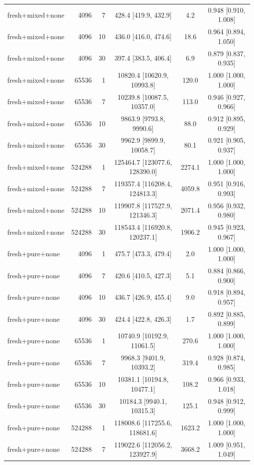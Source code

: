 \begin{longtable}{lrrccc}
fresh+mixed+none & 4096 & 7 & 428.4 [419.9, 432.9] & 4.2 & 0.948 [0.910, 1.008] \\
fresh+mixed+none & 4096 & 10 & 436.0 [416.0, 474.6] & 18.6 & 0.964 [0.894, 1.050] \\
fresh+mixed+none & 4096 & 30 & 397.4 [383.5, 406.4] & 6.9 & 0.879 [0.837, 0.935] \\
fresh+mixed+none & 65536 & 1 & 10820.4 [10620.9, 10993.8] & 120.0 & 1.000 [1.000, 1.000] \\
fresh+mixed+none & 65536 & 7 & 10239.8 [10087.5, 10357.0] & 113.0 & 0.946 [0.927, 0.966] \\
fresh+mixed+none & 65536 & 10 & 9863.9 [9793.8, 9990.6] & 88.0 & 0.912 [0.895, 0.929] \\
fresh+mixed+none & 65536 & 30 & 9962.9 [9899.9, 10058.7] & 80.1 & 0.921 [0.905, 0.937] \\
fresh+mixed+none & 524288 & 1 & 125464.7 [123077.6, 128390.0] & 2274.1 & 1.000 [1.000, 1.000] \\
fresh+mixed+none & 524288 & 7 & 119357.4 [116208.4, 124813.3] & 4059.8 & 0.951 [0.916, 0.993] \\
fresh+mixed+none & 524288 & 10 & 119907.8 [117527.9, 121346.3] & 2071.4 & 0.956 [0.932, 0.980] \\
fresh+mixed+none & 524288 & 30 & 118543.4 [116920.8, 120237.1] & 1906.2 & 0.945 [0.923, 0.967] \\
fresh+pure+none & 4096 & 1 & 475.7 [473.3, 479.4] & 2.0 & 1.000 [1.000, 1.000] \\
fresh+pure+none & 4096 & 7 & 420.6 [410.5, 427.3] & 5.1 & 0.884 [0.866, 0.900] \\
fresh+pure+none & 4096 & 10 & 436.7 [426.9, 455.4] & 9.0 & 0.918 [0.894, 0.957] \\
fresh+pure+none & 4096 & 30 & 424.4 [422.8, 426.3] & 1.7 & 0.892 [0.885, 0.899] \\
fresh+pure+none & 65536 & 1 & 10740.9 [10192.9, 11061.5] & 270.6 & 1.000 [1.000, 1.000] \\
fresh+pure+none & 65536 & 7 & 9968.3 [9401.9, 10393.2] & 319.4 & 0.928 [0.874, 0.985] \\
fresh+pure+none & 65536 & 10 & 10381.1 [10194.8, 10477.1] & 108.2 & 0.966 [0.933, 1.018] \\
fresh+pure+none & 65536 & 30 & 10184.3 [9940.1, 10315.3] & 125.1 & 0.948 [0.912, 0.999] \\
fresh+pure+none & 524288 & 1 & 118008.6 [117255.6, 118681.6] & 1623.2 & 1.000 [1.000, 1.000] \\
fresh+pure+none & 524288 & 7 & 119022.6 [112056.2, 123927.9] & 3668.2 & 1.009 [0.951, 1.049] \\

\end{longtable}
